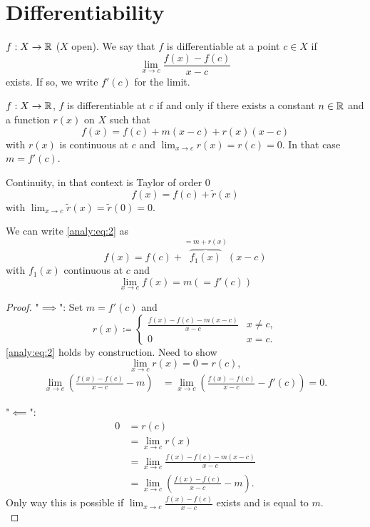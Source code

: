 \documentclass[10pt, a4paper]{article}
\begin{document}
\newpage

\section{Differentiability}

\begin{definition}
    $f : X \to \mathbb{R}$
    ($X$ open).
    We say that $f$ is differentiable at a point $c \in X$ if
    \[
    \lim_{x \to c}\frac{f(x) - f(c)}{x - c}
    \]
    exists.
    If so,
    we write $f'(c)$ for the limit.
\end{definition}

\begin{lemma}\label{analy:lem:firstordertaylor}
    $f : X \to \mathbb{R}$,
    $f$ is differentiable at $c$ if and only if there exists a constant $n \in \mathbb{R}$ and a function $r(x)$ on $X$ such that
    \begin{equation}\label{analy:eq:2}
        f(x) = f(c) + m(x - c) + r(x)(x - c)
    \end{equation}
    with $r(x)$ is continuous at $c$ and $\lim_{x \to c} r(x) = r(c) = 0$.
    In that case $m = f'(c)$.
\end{lemma}

Continuity,
in that context is Taylor of order $0$
\[
f(x) = f(c) + \tilde{r}(x)
\]
with $\lim_{x \to c}\tilde{r}(x) = \tilde{r}(0) = 0$.

We can write \eqref{analy:eq:2} as
\[
f(x) = f(c) + \overbrace{f_1(x)}^{= m + r(x)}(x - c)
\]
with $f_1(x)$ continuous at $c$ and
\[
\lim_{x \to c}f(x) = m(= f'(c))
\]

\begin{lemma}[continues = analy:lem:firstordertaylor]
    \begin{proof}
        "$\implies$":
        Set $m = f'(c)$ and
        \[
        r(x) \coloneqq \begin{cases}
            \frac{f(x) - f(c) - m(x - c)}{x - c} & x \neq c, \\
            0 & x = c.
        \end{cases}
        \]
        \eqref{analy:eq:2} holds by construction.
        Need to show
        \[
        \lim_{x \to c}r(x) = 0 = r(c),
        \]
        \begin{align*}
            \lim_{x \to c}\left(\frac{f(x) - f(c)}{x - c} - m\right) &= \lim_{x \to c}\left(\frac{f(x) - f(c)}{x - c} - f'(c)\right) = 0.
        \end{align*}

        "$\impliedby$":
        \begin{align*}
            0 &= r(c) \\
            &= \lim_{x \to c}r(x) \\
            &= \lim_{x \to c}\frac{f(x) - f(c) - m(x - c)}{x - c} \\
            &= \lim_{x \to c}\left(\frac{f(x) - f(c)}{x - c} - m\right).
        \end{align*}
        Only way this is possible if $\lim_{x \to c}\frac{f(x) - f(c)}{x - c}$ exists and is equal to $m$.
        \[
        \]
    \end{proof}
\end{lemma}
\end{document}
